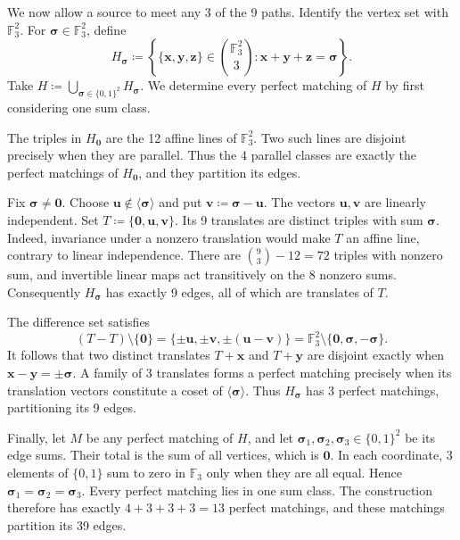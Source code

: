 \documentclass[10pt]{article}
\numberwithin{equation}{section}
\theoremstyle{definition}
\begin{document}
We now allow a source to meet any 3 of the 9 paths. Identify the vertex set with $\mathbb F_3^2$. For $\boldsymbol\sigma\in\mathbb F_3^2$, define
\[
 H_{\boldsymbol\sigma}\coloneqq\left\{\{\mathbf x,\mathbf y,\mathbf z\}\in\binom{\mathbb F_3^2}{3}\colon \mathbf x+\mathbf y+\mathbf z=\boldsymbol\sigma\right\}.
\]
Take $H\coloneqq\bigcup_{\boldsymbol\sigma\in\{0,1\}^2}H_{\boldsymbol\sigma}$. We determine every perfect matching of $H$ by first considering one sum class.

The triples in $H_{\mathbf0}$ are the 12 affine lines of $\mathbb F_3^2$. Two such lines are disjoint precisely when they are parallel. Thus the 4 parallel classes are exactly the perfect matchings of $H_{\mathbf0}$, and they partition its edges.

Fix $\boldsymbol\sigma\ne\mathbf0$. Choose $\mathbf u\notin\langle\boldsymbol\sigma\rangle$ and put $\mathbf v\coloneqq\boldsymbol\sigma-\mathbf u$. The vectors $\mathbf u,\mathbf v$ are linearly independent. Set $T\coloneqq\{\mathbf0,\mathbf u,\mathbf v\}$. Its 9 translates are distinct triples with sum $\boldsymbol\sigma$. Indeed, invariance under a nonzero translation would make $T$ an affine line, contrary to linear independence. There are $\binom93-12=72$ triples with nonzero sum, and invertible linear maps act transitively on the 8 nonzero sums. Consequently $H_{\boldsymbol\sigma}$ has exactly 9 edges, all of which are translates of $T$.

The difference set satisfies
\[
 (T-T)\setminus\{\mathbf0\}
 =\{\pm\mathbf u,\pm\mathbf v,\pm(\mathbf u-\mathbf v)\}
 =\mathbb F_3^2\setminus\{\mathbf0,\boldsymbol\sigma,-\boldsymbol\sigma\}.
\]
It follows that two distinct translates $T+\mathbf x$ and $T+\mathbf y$ are disjoint exactly when $\mathbf x-\mathbf y=\pm\boldsymbol\sigma$. A family of 3 translates forms a perfect matching precisely when its translation vectors constitute a coset of $\langle\boldsymbol\sigma\rangle$. Thus $H_{\boldsymbol\sigma}$ has 3 perfect matchings, partitioning its 9 edges.

Finally, let $M$ be any perfect matching of $H$, and let $\boldsymbol\sigma_1,\boldsymbol\sigma_2,\boldsymbol\sigma_3\in\{0,1\}^2$ be its edge sums. Their total is the sum of all vertices, which is $\mathbf0$. In each coordinate, 3 elements of $\{0,1\}$ sum to zero in $\mathbb F_3$ only when they are all equal. Hence $\boldsymbol\sigma_1=\boldsymbol\sigma_2=\boldsymbol\sigma_3$. Every perfect matching lies in one sum class. The construction therefore has exactly $4+3+3+3=13$ perfect matchings, and these matchings partition its 39 edges.
\end{document}
